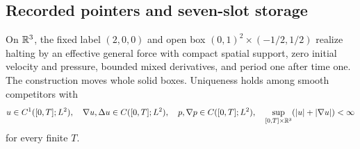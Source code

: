 \subsection{Recorded pointers and seven-slot storage}\label{bc:recorded-pointer-section}
\begin{theorem}
\label{bc:recorded-pointer-event}
On $\mathbb R^3$, the fixed label $(2,0,0)$ and open box
$(0,1)^2\times(-1/2,1/2)$ realize halting by an effective general force
with compact spatial support, zero initial velocity and pressure, bounded
mixed derivatives, and period one after time one. The construction moves
whole solid boxes. Uniqueness holds among smooth competitors with
\[
 u\in C^1([0,T];L^2),\quad \nabla u,\Delta u\in C([0,T];L^2),
 \quad p,\nabla p\in C([0,T];L^2),\quad
 \sup_{[0,T]\times\mathbb R^3}(|u|+|\nabla u|)<\infty
\]
for every finite $T$.
\end{theorem}
